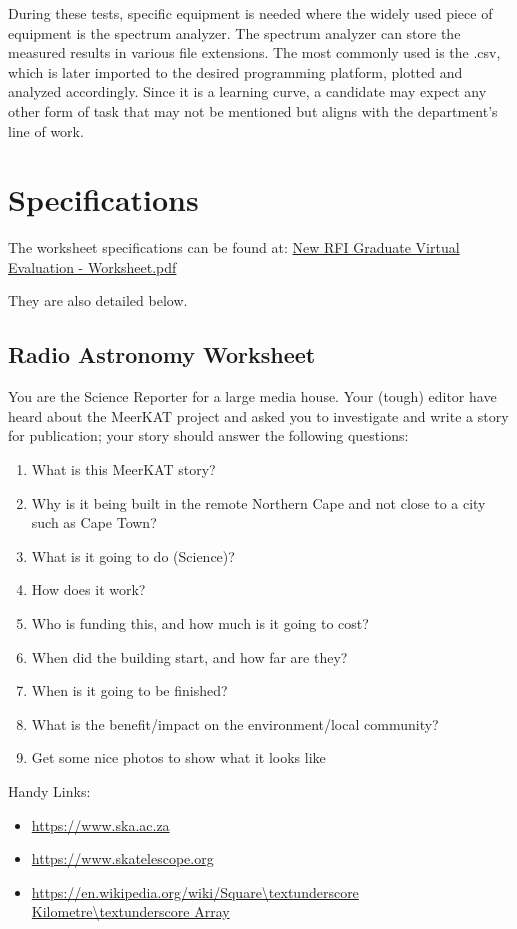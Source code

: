 \documentclass[12pt,a4paper]{report}
\begin{document}
	During these tests, specific equipment is needed where the widely used piece of equipment is the spectrum analyzer. The spectrum analyzer can store the measured results in various file extensions. The most commonly used is the .csv, which is later imported to the desired programming platform, plotted and analyzed accordingly. Since it is a learning curve, a candidate may expect any other form of task that may not be mentioned but aligns with the department's line of work.
	
	\section{Specifications}
	
	The worksheet specifications can be found at:  \href{https://github.com/Casablanca25273/Worksheet}{New RFI Graduate Virtual Evaluation - Worksheet.pdf}
	
	
	They are also detailed below.
	
	\subsection*{Radio Astronomy Worksheet}	
	
	You are the Science Reporter for a large media house. Your (tough) editor have heard about the MeerKAT project and asked you to investigate and write a story for publication; your story should answer the following questions:
	\begin{enumerate}
		\item What is this MeerKAT story?
		\item Why is it being built in the remote Northern Cape and not close to a city such as Cape Town?
		\item What is it going to do (Science)?
		\item How does it work?
		\item Who is funding this, and how much is it going to cost?
		\item When did the building start, and how far are they?
		\item When is it going to be finished?
		\item What is the benefit/impact on the environment/local community?
		\item Get some nice photos to show what it looks like
	\end{enumerate}	
	
	Handy Links:
	\begin{itemize}
		\item \url{https://www.ska.ac.za}
		\item \url{https://www.skatelescope.org}
		\item \url{https://en.wikipedia.org/wiki/Square\textunderscore Kilometre\textunderscore Array}
	\end{itemize}
	
\end{document}
